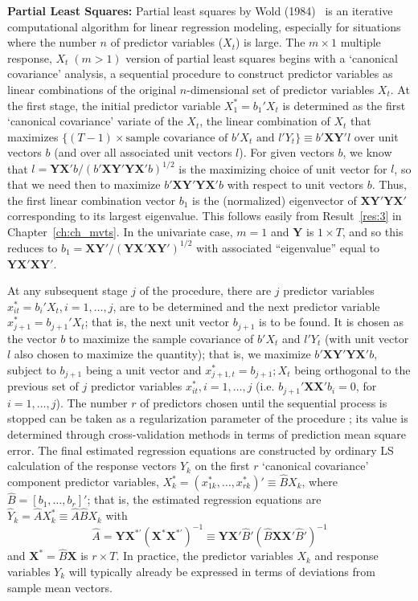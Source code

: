 \noindent\textbf{Partial Least Squares:} Partial least squares by Wold (1984)~\cite{wold} is an iterative computational algorithm for linear regression modeling, especially for situations where the number $n$ of predictor variables ($X_t$) is large. The $m \times 1$ multiple response, $X_t \;(m>1)$ version of partial least squares begins with a `canonical covariance' analysis, a sequential procedure to construct predictor variables as linear combinations of the original $n$-dimensional set of predictor variables $X_t$. At the first stage, the initial predictor variable $X_{1}^*=b_1'X_t$ is determined as the first `canonical covariance' variate of the $X_t$, the linear combination of $X_t$ that maximizes $\{(T - 1) \times \text{sample covariance of } b'X_t \text{ and } l'Y_t \} \equiv b' \mathbf{XY}' l$ over unit vectors $b$ (and over all associated unit vectors $l$). For given vectors $b$, we know that $l=\mathbf{YX'} b/(b' \mathbf{XY'YX'}b)^{1/2}$ is the maximizing choice of unit vector for $l$, so that we need then to maximize $b' \mathbf{XY'YX'}b$ with respect to unit vectors $b$. Thus, the first linear combination vector $b_1$ is the (normalized) eigenvector of $\mathbf{XY'YX'}$ corresponding to its largest eigenvalue. This follows easily from Result~\ref{res:3} in Chapter~\ref{ch:ch_mvts}. In the univariate case, $m=1$ and $\mathbf{Y}$ is $1 \times T$, and so this reduces to $b_1=\mathbf{XY'}/(\mathbf{YX'XY'})^{1/2}$ with associated ``eigenvalue'' equal to $\mathbf{YX'XY'}$.


At any subsequent stage $j$ of the procedure, there are $j$ predictor variables $x_{it}^*= b_i' X_t, i=1,\ldots, j$, are to be determined and the next predictor variable $x_{j+1}^*= b_{j+1}'X_t$; that is, the next unit vector $b_{j+1}$ is to be found. It is chosen as the vector $b$ to maximize the sample covariance of $b'X_t$ and $l' Y_t$ (with unit vector $l$ also chosen to maximize the quantity); that is, we maximize $b' \mathbf{XY'YX'}b$, subject to $b_{j+1}$ being a unit vector and $x_{j+1,t}^*=b_{j+1}; X_t$ being orthogonal to the previous set of $j$ predictor variables $x_{it}^*, i=1,\ldots,j$ (i.e. $b_{j+1}' \mathbf{XX'} b_i=0$, for $i=1,\ldots,j$). The number $r$ of predictors chosen until the sequential process is stopped can be taken as a regularization parameter of the procedure ; its value is determined through cross-validation methods in terms of prediction mean square error. The final estimated regression equations are constructed by ordinary LS calculation of the response vectors $Y_k$ on the first $r$ `canonical covariance' component predictor variables, $X_k^*= (x_{1k}^*,\ldots,x_{rk}^*)' \equiv \hat{B} X_k$, where $\hat{B}=[b_1,\ldots,b_r]'$; that is, the estimated regression equations are $\hat{Y}_k= \hat{A}X_k^* \equiv \hat{A}\hat{B} X_k$ with
	\[
	\hat{A}=\mathbf{YX}^{*'} (\mathbf{X}^* \mathbf{X}^{*'})^{-1} \equiv \mathbf{YX'} \hat{B}' (\hat{B} \mathbf{XX'} \hat{B}')^{-1}
	\]
and $\mathbf{X}^*=\hat{B}\mathbf{X}$ is $r \times T$. In practice, the predictor variables $X_k$ and response variables $Y_k$ will typically already be expressed in terms of deviations from sample mean vectors.


